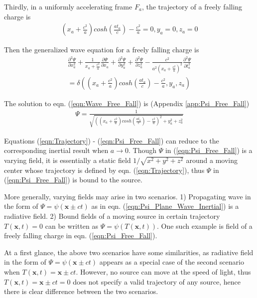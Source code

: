 \documentclass[prd,showpacs,preprint]{revtex4-1}
\begin{document}
Thirdly, in a uniformly accelerating frame $F_a$, the trajectory of a freely falling charge is
\begin{eqnarray}
(x_a+\frac{c^2}{a})cosh(\frac{at_a}{c})-\frac{c^2}{a}=0,
y_a=0,
z_a=0
\label{eqn:Trajectory}
\end{eqnarray}

Then the generalized wave equation for a freely falling charge is
\begin{eqnarray}
\frac{\partial^2 \Psi}{\partial x_a^2} + \frac{1}{x_a+\frac{c^2}{a}}\frac{\partial \Psi}{\partial x_a} + \frac{\partial^2 \Psi}{\partial y_a^2} + \frac{\partial^2 \Psi}{\partial z_a^2} - \frac{c^2}{a^2(x_a+\frac{c^2}{a})^2}\frac{\partial^2 \Psi}{\partial t_a^2}\nonumber\\
=\delta((x_a+\frac{c^2}{a})cosh(\frac{at_a}{c})-\frac{c^2}{a},y_a,z_a)
\label{eqn:Wave_Free_Fall}
\end{eqnarray}

The solution to eqn. (\ref{eqn:Wave_Free_Fall}) is (Appendix \ref{app:Psi_Free_Fall})
\begin{eqnarray}
\Psi=\frac{1}{\sqrt{((x_a+\frac{c^2}{a})cosh(\frac{at_a}{c})-\frac{c^2}{a})^2+y_a^2+z_a^2}}
\label{eqn:Psi_Free_Fall}
\end{eqnarray}

Equations (\ref{eqn:Trajectory}) - (\ref{eqn:Psi_Free_Fall}) can reduce to the corresponding inertial result when $a\to 0$. Though $\Psi$ in (\ref{eqn:Psi_Free_Fall}) is a varying field, it is essentially a static field $1/\sqrt{x^2+y^2+z^2}$ around a moving center whose trajectory is defined by eqn. (\ref{eqn:Trajectory}), thus $\Psi$ in (\ref{eqn:Psi_Free_Fall}) is bound to the source.

More generally, varying fields may arise in two scenarios. 1) Propagating wave in the form of $\Psi=\psi(\mathbf{x}\pm ct)$ as in eqn. (\ref{eqn:Psi_Plane_Wave_Inertial}) is a radiative field. 2) Bound fields of a moving source in certain trajectory $T(\mathbf{x},t)=0$ can be written as $\Psi=\psi(T(\mathbf{x},t))$. One such example is field of a freely falling charge in eqn. (\ref{eqn:Psi_Free_Fall}).

At a first glance, the above two scenarios have some similarities, as radiative field in the form of $\Psi=\psi(\mathbf{x}\pm ct)$ appears as a special case of the second scenario when $T(\mathbf{x},t)=\mathbf{x}\pm ct$. However, no source can move at the speed of light, thus $T(\mathbf{x},t)=\mathbf{x}\pm ct=0$ does not specify a valid trajectory of any source, hence there is clear difference between the two scenarios.
\end{document}
